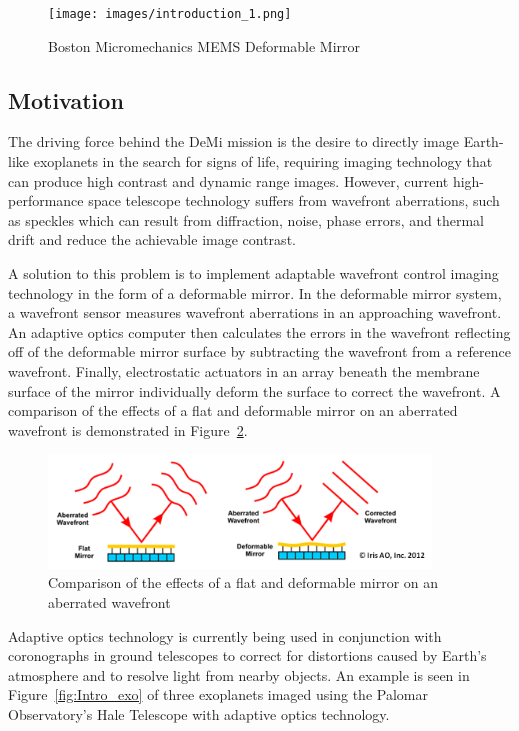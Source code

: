 \documentclass[12pt]{article}
\begin{document}
\begin{figure}[!ht]
\centering
\texttt{[image: images/introduction\_1.png]}
\caption{Boston Micromechanics MEMS Deformable Mirror\cite{bos-micro-demi}}
\label{fig:Intro_demi}
\end{figure}

\subsection{Motivation}
The driving force behind the DeMi mission is the desire to directly image Earth-like exoplanets in the search for signs of life, requiring imaging technology that can produce high contrast and dynamic range images.  However, current high-performance space telescope technology suffers from wavefront aberrations, such as speckles which can result from diffraction, noise, phase errors, and thermal drift and reduce the achievable image contrast.\cite{cahoy-unpublished}

A solution to this problem is to implement adaptable wavefront control imaging technology in the form of a deformable mirror. In the deformable mirror system, a wavefront sensor measures wavefront aberrations in an approaching wavefront. An adaptive optics computer then calculates the errors in the wavefront reflecting off of the deformable mirror surface by subtracting the wavefront from a reference wavefront.\cite{adaptive-optics-overview} Finally, electrostatic actuators in an array beneath the membrane surface of the mirror individually deform the surface to correct the wavefront. A comparison of the effects of a flat and deformable mirror on an aberrated wavefront is demonstrated in Figure~\ref{fig:Intro_wavefront}.   

\begin{figure}[!ht]
\centering
\includegraphics[width=4in]{images/introduction_2.png}
\caption{Comparison of the effects of a flat and deformable mirror on an aberrated wavefront}
\label{fig:Intro_wavefront}
\end{figure}

Adaptive optics technology is currently being used in conjunction with coronographs in ground telescopes to correct for distortions caused by Earth's atmosphere and to resolve light from nearby objects.  An example is seen in Figure~\ref{fig:Intro_exo} of three exoplanets imaged using the Palomar Observatory's Hale Telescope with adaptive optics technology. \cite{serabyn2010}
\end{document}
